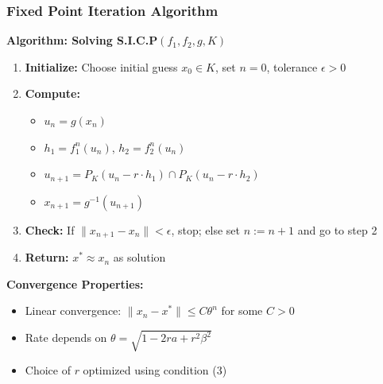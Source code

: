 \documentclass[aspectratio=169,10pt]{beamer}
\begin{document}
\begin{frame}
\frametitle{Fixed Point Iteration Algorithm}

\textbf{Algorithm: Solving S.I.C.P$(f_1, f_2, g, K)$}

\vspace{0.3cm}

\begin{enumerate}
    \item \textbf{Initialize:} Choose initial guess $x_0 \in K$, set $n = 0$, tolerance $\epsilon > 0$

    \item \textbf{Compute:}
    \begin{itemize}
        \item $u_n = g(x_n)$
        \item $h_1 = f_1^n(u_n)$, $h_2 = f_2^n(u_n)$
        \item $u_{n+1} = P_K(u_n - r \cdot h_1) \cap P_K(u_n - r \cdot h_2)$
        \item $x_{n+1} = g^{-1}(u_{n+1})$
    \end{itemize}

    \item \textbf{Check:} If $\|x_{n+1} - x_n\| < \epsilon$, stop; else set $n := n+1$ and go to step 2

    \item \textbf{Return:} $x^* \approx x_n$ as solution
\end{enumerate}

\vspace{0.3cm}

\textbf{Convergence Properties:}
\begin{itemize}
    \item Linear convergence: $\|x_n - x^*\| \leq C\theta^n$ for some $C > 0$
    \item Rate depends on $\theta = \sqrt{1 - 2ra + r^2\beta^2}$
    \item Choice of $r$ optimized using condition (3)
\end{itemize}

\end{frame}
\end{document}
